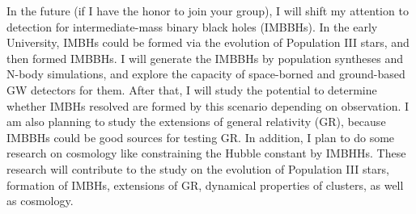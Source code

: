 \documentclass[12pt,a4paper,sans]{article}%
\begin{document}

In the future (if I have the honor to join your group), I will shift my attention to detection for intermediate-mass binary black holes (IMBBHs). In the early
University, IMBHs could be formed via the evolution of Population III stars, and then formed IMBBHs. I will generate the IMBBHs by population syntheses and N-body simulations, and explore the capacity of space-borned and ground-based GW detectors for them. After that, I will study the potential to determine whether IMBHs resolved are formed
by this scenario depending on observation. I am also planning to study the extensions of general relativity (GR), because
IMBBHs could be good sources for testing GR. In addition, I plan to do some research on cosmology like constraining the
Hubble constant by IMBHHs. These research will
contribute to the study on the evolution of Population III stars, formation of IMBHs, extensions of GR, dynamical properties of clusters, as well as cosmology.
\end{document}
